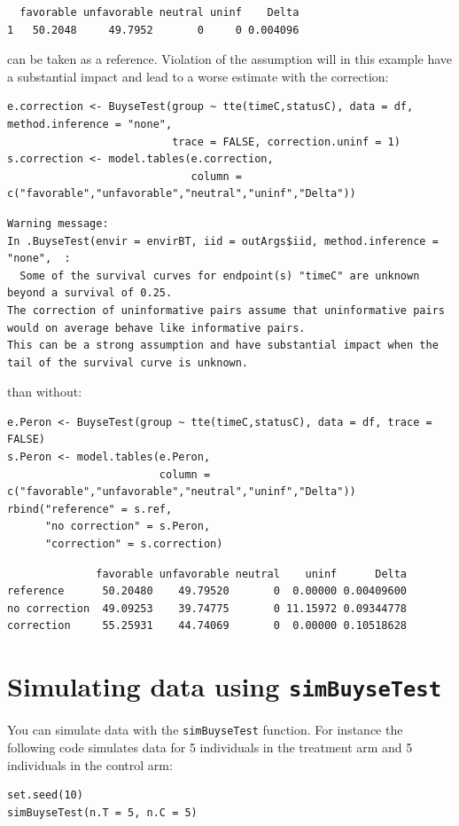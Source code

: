 \documentclass[12pt]{article}
\begin{document}
\begin{verbatim}
  favorable unfavorable neutral uninf    Delta
1   50.2048     49.7952       0     0 0.004096
\end{verbatim}


can be taken as a reference. Violation of the assumption will in this
example have a substantial impact and lead to a worse estimate with
the correction:
\lstset{language=r,label= ,caption= ,captionpos=b,numbers=none}
\begin{lstlisting}
e.correction <- BuyseTest(group ~ tte(timeC,statusC), data = df, method.inference = "none",
                          trace = FALSE, correction.uninf = 1)
s.correction <- model.tables(e.correction,
                             column = c("favorable","unfavorable","neutral","uninf","Delta"))
\end{lstlisting}

\begin{verbatim}
Warning message:
In .BuyseTest(envir = envirBT, iid = outArgs$iid, method.inference = "none",  :
  Some of the survival curves for endpoint(s) "timeC" are unknown beyond a survival of 0.25.
The correction of uninformative pairs assume that uninformative pairs would on average behave like informative pairs. 
This can be a strong assumption and have substantial impact when the tail of the survival curve is unknown.
\end{verbatim}


than without:
\lstset{language=r,label= ,caption= ,captionpos=b,numbers=none}
\begin{lstlisting}
e.Peron <- BuyseTest(group ~ tte(timeC,statusC), data = df, trace = FALSE)
s.Peron <- model.tables(e.Peron,
                        column = c("favorable","unfavorable","neutral","uninf","Delta"))
rbind("reference" = s.ref,
      "no correction" = s.Peron,
      "correction" = s.correction)
\end{lstlisting}
\begin{verbatim}
              favorable unfavorable neutral    uninf      Delta
reference      50.20480    49.79520       0  0.00000 0.00409600
no correction  49.09253    39.74775       0 11.15972 0.09344778
correction     55.25931    44.74069       0  0.00000 0.10518628
\end{verbatim}


\clearpage

\section{Simulating data using \texttt{simBuyseTest}}
\label{sec:org675d3a7}
You can simulate data with the \texttt{simBuyseTest} function. For instance
the following code simulates data for 5 individuals in the treatment
arm and 5 individuals in the control arm:
\lstset{language=r,label= ,caption= ,captionpos=b,numbers=none}
\begin{lstlisting}
set.seed(10)
simBuyseTest(n.T = 5, n.C = 5)
\end{lstlisting}
\end{document}
